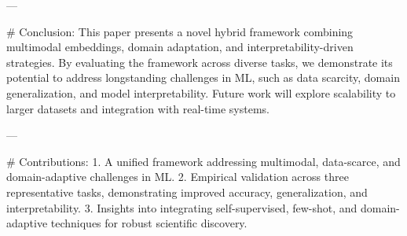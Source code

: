 ---

# Conclusion:
This paper presents a novel hybrid framework combining multimodal embeddings, domain adaptation, and interpretability-driven strategies. By evaluating the framework across diverse tasks, we demonstrate its potential to address longstanding challenges in ML, such as data scarcity, domain generalization, and model interpretability. Future work will explore scalability to larger datasets and integration with real-time systems.

---

# Contributions:
1. A unified framework addressing multimodal, data-scarce, and domain-adaptive challenges in ML.
2. Empirical validation across three representative tasks, demonstrating improved accuracy, generalization, and interpretability.
3. Insights into integrating self-supervised, few-shot, and domain-adaptive techniques for robust scientific discovery.

